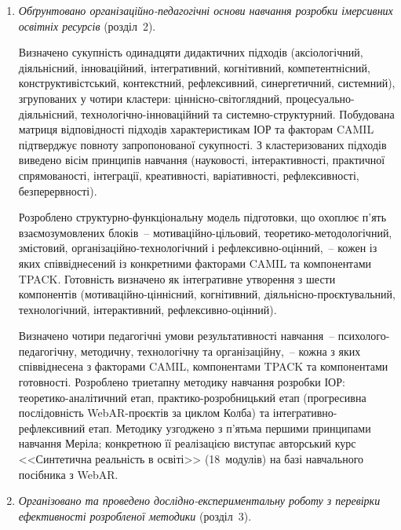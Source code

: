 \begin{enumerate}[label=\arabic*.]
Порівняльний аналіз ОПП 38~закладів вищої освіти за запропонованою моделлю рівнів зрілості інтеграції ІОР показав, що абсолютна більшість перебуває на рівнях~0--2, тоді як рівні~3--4 представлені одиничними випадками. Дослідницька траєкторія КДПУ (2020--2024) є єдиним задокументованим вітчизняним прикладом системного просування від рівня~2 до рівня~3--4.

\item \textit{Обґрунтовано організаційно-педагогічні основи навчання розробки імерсивних освітніх ресурсів} (розділ~2).

Визначено сукупність одинадцяти дидактичних підходів (аксіологічний, діяльнісний, інноваційний, інтегративний, когнітивний, компетентнісний, конструктивістський, контекстний, рефлексивний, синергетичний, системний), згрупованих у чотири кластери: ціннісно-світоглядний, процесуально-діяльнісний, технологічно-інноваційний та системно-структурний. Побудована матриця відповідності підходів характеристикам ІОР та факторам CAMIL підтверджує повноту запропонованої сукупності. З кластеризованих підходів виведено вісім принципів навчання (науковості, інтерактивності, практичної спрямованості, інтеграції, креативності, варіативності, рефлексивності, безперервності).

Розроблено структурно-функціональну модель підготовки, що охоплює п'ять взаємозумовлених блоків~-- мотиваційно-цільовий, теоретико-методологічний, змістовий, організаційно-технологічний і рефлексивно-оцінний,~-- кожен із яких співвіднесений із конкретними факторами CAMIL та компонентами TPACK. Готовність визначено як інтегративне утворення з шести компонентів (мотиваційно-ціннісний, когнітивний, діяльнісно-проєктувальний, технологічний, інтерактивний, рефлексивно-оцінний).

Визначено чотири педагогічні умови результативності навчання~-- психолого-педагогічну, методичну, технологічну та організаційну,~-- кожна з яких співвіднесена з факторами CAMIL, компонентами TPACK та компонентами готовності. Розроблено триетапну методику навчання розробки ІОР: теоретико-аналітичний етап, практико-розробницький етап (прогресивна послідовність WebAR-проєктів за циклом Колба) та інтегративно-рефлексивний етап. Методику узгоджено з п'ятьма першими принципами навчання Меріла; конкретною її реалізацією виступає авторський курс <<Синтетична реальність в освіті>> (18~модулів) на базі навчального посібника з WebAR.

\item \textit{Організовано та проведено дослідно-експериментальну роботу з перевірки ефективності розробленої методики} (розділ~3).


\end{enumerate}

